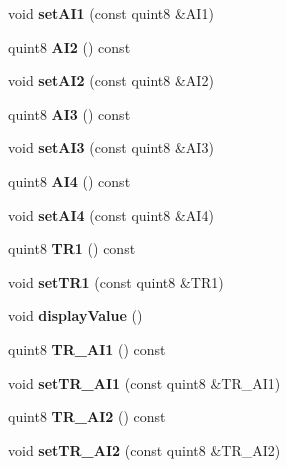 \begin{DoxyCompactItemize}
\item 
\mbox{\label{class_data_frame_a580d0c833e4555bb147688c1a28568dd}} 
void {\bfseries set\+A\+I1} (const quint8 \&A\+I1)
\item 
\mbox{\label{class_data_frame_a0b5c5c36cc28249a83597ee8b3ad3715}} 
quint8 {\bfseries A\+I2} () const
\item 
\mbox{\label{class_data_frame_a673a8b5bcea8ca0dc74aa9609d6251c9}} 
void {\bfseries set\+A\+I2} (const quint8 \&A\+I2)
\item 
\mbox{\label{class_data_frame_ad818547aa1761a996aaf92308d154a59}} 
quint8 {\bfseries A\+I3} () const
\item 
\mbox{\label{class_data_frame_a86b82433a43d0739ed9c8922d84bec70}} 
void {\bfseries set\+A\+I3} (const quint8 \&A\+I3)
\item 
\mbox{\label{class_data_frame_a3ca32e99c6a8081b45fcf5c4e681a797}} 
quint8 {\bfseries A\+I4} () const
\item 
\mbox{\label{class_data_frame_a4fee88ab45e458541104a299d2ac6b98}} 
void {\bfseries set\+A\+I4} (const quint8 \&A\+I4)
\item 
\mbox{\label{class_data_frame_a7f73f817e65d9623cb941903fb636924}} 
quint8 {\bfseries T\+R1} () const
\item 
\mbox{\label{class_data_frame_a3338fbf0f2d3af6dc54a4507f51e6d1e}} 
void {\bfseries set\+T\+R1} (const quint8 \&T\+R1)
\item 
\mbox{\label{class_data_frame_aca1c57b8f8116b9da32093156870d76a}} 
void {\bfseries display\+Value} ()
\item 
\mbox{\label{class_data_frame_a672b2ba3dacf416f9bfb6bfdf2803c6e}} 
quint8 {\bfseries T\+R\+\_\+\+A\+I1} () const
\item 
\mbox{\label{class_data_frame_a7de40c1a5a071bb75845511cd64bcc99}} 
void {\bfseries set\+T\+R\+\_\+\+A\+I1} (const quint8 \&T\+R\+\_\+\+A\+I1)
\item 
\mbox{\label{class_data_frame_af45285ae18e3531cca29b4886de0b687}} 
quint8 {\bfseries T\+R\+\_\+\+A\+I2} () const
\item 
\mbox{\label{class_data_frame_a5f8ea5909cf41f6e96ec8a716e83fa65}} 
void {\bfseries set\+T\+R\+\_\+\+A\+I2} (const quint8 \&T\+R\+\_\+\+A\+I2)
\end{DoxyCompactItemize}



